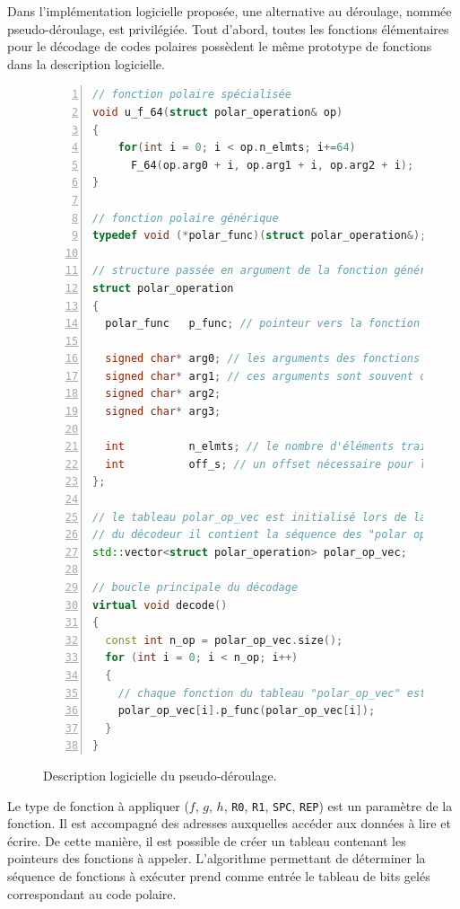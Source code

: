 Dans l'implémentation logicielle proposée, une alternative au déroulage, nommée pseudo-déroulage, est privilégiée. Tout d'abord, toutes les fonctions élémentaires pour le décodage de codes polaires possèdent le même prototype de fonctions dans la description logicielle.
\begin{figure}[htp]
\begin{lstlisting}[language=C++, numbers=left, numbersep=0.3em, tabsize=2, basicstyle=\footnotesize\ttfamily]
// fonction polaire spécialisée
void u_f_64(struct polar_operation& op)
{
    for(int i = 0; i < op.n_elmts; i+=64)
      F_64(op.arg0 + i, op.arg1 + i, op.arg2 + i);
}

// fonction polaire générique
typedef void (*polar_func)(struct polar_operation&);

// structure passée en argument de la fonction générique
struct polar_operation
{
  polar_func   p_func; // pointeur vers la fonction polaire spécialisée 

  signed char* arg0; // les arguments des fonctions polaires spécialisées
  signed char* arg1; // ces arguments sont souvent des adresses
  signed char* arg2;
  signed char* arg3;

  int          n_elmts; // le nombre d'éléments traités en parallèle
  int          off_s; // un offset nécessaire pour l'accès aux PSs
};

// le tableau polar_op_vec est initialisé lors de la construction
// du décodeur il contient la séquence des "polar operation"
std::vector<struct polar_operation> polar_op_vec;

// boucle principale du décodage
virtual void decode()
{
  const int n_op = polar_op_vec.size();
  for (int i = 0; i < n_op; i++)
  {
    // chaque fonction du tableau "polar_op_vec" est appelée
    polar_op_vec[i].p_func(polar_op_vec[i]); 
  }
}
\end{lstlisting}
\caption{Description logicielle du pseudo-déroulage.}
\label{fig:tensilica_code}
\end{figure}

Le type de fonction à appliquer ($f$, $g$, $h$, \texttt{R0}, \texttt{R1}, \texttt{SPC}, \texttt{REP}) est un paramètre de la fonction. Il est accompagné des adresses auxquelles accéder aux données à lire et écrire. De cette manière, il est possible de créer un tableau contenant les pointeurs des fonctions à appeler. L'algorithme permettant de déterminer la séquence de fonctions à exécuter prend comme entrée le tableau de bits gelés correspondant au code polaire.

